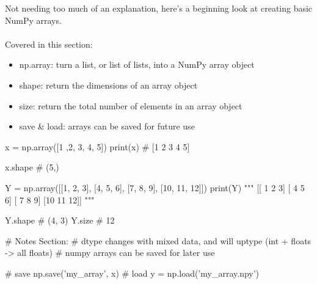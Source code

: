 
Not needing too much of an explanation, here's a beginning look at creating basic NumPy arrays.
\\\\
Covered in this section:
\begin{itemize}
	\item np.array: turn a list, or list of lists, into a NumPy array object
	\item shape: return the dimensions of an array object
	\item size: return the total number of elements in an array object
	\item save \& load: arrays can be saved for future use
\end{itemize}

\begin{python}
	x = np.array([1 ,2, 3, 4, 5])
	print(x)
	# [1 2 3 4 5]
	
	x.shape
	# (5,)
	
	Y = np.array([[1, 2, 3], [4, 5, 6], [7, 8, 9], [10, 11, 12]])
	print(Y)
	"""
	[[ 1  2  3]
	[ 4  5  6]
	[ 7  8  9]
	[10 11 12]]
	"""
	
	Y.shape
	# (4, 3)
	Y.size
	# 12
	
	# Notes Section:
	# dtype changes with mixed data, and will uptype (int + floats -> all floats) 
	# numpy arrays can be saved for later use
	
	# save
	np.save('my_array', x)
	# load
	y = np.load('my_array.npy')
\end{python}
